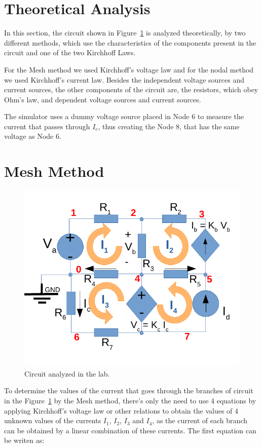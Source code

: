 \section{Theoretical Analysis}
\label{sec:analysis}

In this section, the circuit shown in Figure~\ref{fig:rc} is analyzed
theoretically, by two different methods, which use the characteristics of the components present in the circuit and one of the two Kirchhoff Laws.

For the Mesh method we used Kirchhoff's voltage law and for the nodal method we used Kirchhoff's current law.
Besides the independent voltage sources and current sources, the other components of the circuit are, the resistors, which obey Ohm's law, and dependent voltage sources and current sources.

The simulator uses a dummy voltage source placed in Node 6 to measure the current that passes through $I_c$, thus creating the Node 8, that has the same voltage as Node 6.

\section{Mesh Method}

\begin{figure}[h] \centering
\includegraphics[width=0.6\linewidth]{mesh_diagram.pdf}
\caption{Circuit analyzed in the lab.}
\label{fig:rc}
\end{figure}


To determine the values of the current that goes through the branches of circuit in the Figure~\ref{fig:rc} by the Mesh method, there's only the need to use 4 equations by applying Kirchhoff's voltage law or other relations to obtain the values of 4 unknown values of the currents $I_1$, $I_2$, $I_3$ and $I_4$, as the current of each branch can be obtained by a linear combination of these currents.
	The first equation can be writen as:

